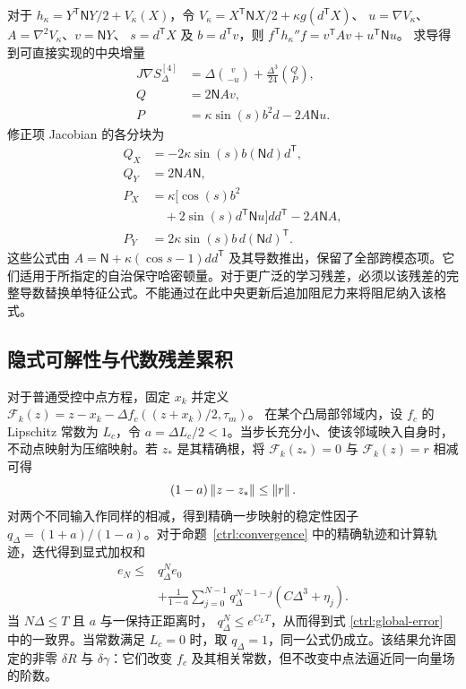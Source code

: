 对于 $h_\kappa=Y^{\mathsf T}\mathsf N Y/2+V_\kappa(X)$，令
$V_\kappa=X^{\mathsf T}\mathsf N X/2+\kappa g(d^{\mathsf T}X)$、
$u=\nabla V_\kappa$、$A=\nabla^2V_\kappa$、$v=\mathsf N Y$、
$s=d^{\mathsf T}X$ 及 $b=d^{\mathsf T}v$，则
$f^{\mathsf T}h_\kappa''f=v^{\mathsf T}Av+u^{\mathsf T}\mathsf N u$。
求导得到可直接实现的中央增量
\begin{equation}\label{ss:central4-magnetic}
\begin{aligned}
 J\nabla S_\Delta^{[4]}
 &=\Delta\binom{v}{-u}+\frac{\Delta^3}{24}\binom{Q}{P},\\
 Q&=2\mathsf N A v,\\
 P&=\kappa\sin(s)b^2d-2A\mathsf N u.
\end{aligned}
\end{equation}
修正项 Jacobian 的各分块为
\begin{equation}\label{ss:central4-magnetic-jacobian}
\begin{aligned}
 Q_X&=-2\kappa\sin(s)b(\mathsf N d)d^{\mathsf T},\\
 Q_Y&=2\mathsf N A\mathsf N,\\
 P_X&=\kappa[\cos(s)b^2\\
    &\quad+2\sin(s)d^{\mathsf T}\mathsf N u]dd^{\mathsf T}-2A\mathsf N A,\\
 P_Y&=2\kappa\sin(s)b\,d(\mathsf N d)^{\mathsf T}.
\end{aligned}
\end{equation}
这些公式由
$A=\mathsf N+\kappa(\cos s-1)dd^{\mathsf T}$ 及其导数推出，保留了全部跨模态项。它们适用于所指定的自治保守哈密顿量。对于更广泛的学习残差，必须以该残差的完整导数替换单特征公式。不能通过在此中央更新后追加阻尼力来将阻尼纳入该格式。

\subsection{隐式可解性与代数残差累积}
\label{ss:inexact-solve}

对于普通受控中点方程，固定 $x_k$ 并定义
$\mathcal F_k(z)=z-x_k-\Delta f_c((z+x_k)/2,\tau_m)$。
在某个凸局部邻域内，设 $f_c$ 的 Lipschitz 常数为 $L_c$，令 $a=\Delta L_c/2<1$。当步长充分小、使该邻域映入自身时，不动点映射为压缩映射。若 $z_*$ 是其精确根，将 $\mathcal F_k(z_*)=0$ 与 $\mathcal F_k(z)=r$ 相减可得
\[
 (1-a)\left\lVert z-z_*\right\rVert\le\left\lVert r\right\rVert.
\]
对两个不同输入作同样的相减，得到精确一步映射的稳定性因子
$q_\Delta=(1+a)/(1-a)$。对于命题~\ref{ctrl:convergence} 中的精确轨迹和计算轨迹，迭代得到显式加权和
\begin{equation}\label{ss:residual-sum}
\begin{aligned}
 e_N\le{}&q_\Delta^N e_0\\
 &+\frac{1}{1-a}\sum_{j=0}^{N-1}
       q_\Delta^{N-1-j}(C\Delta^3+\eta_j).
\end{aligned}
\end{equation}
当 $N\Delta\le T$ 且 $a$ 与一保持正距离时，
$q_\Delta^N\le e^{C_LT}$，从而得到式
\eqref{ctrl:global-error} 中的一致界。当常数满足 $L_c=0$ 时，取 $q_\Delta=1$，同一公式仍成立。该结果允许固定的非零 $\delta R$ 与 $\delta\gamma$：它们改变 $f_c$ 及其相关常数，但不改变中点法逼近同一向量场的阶数。

